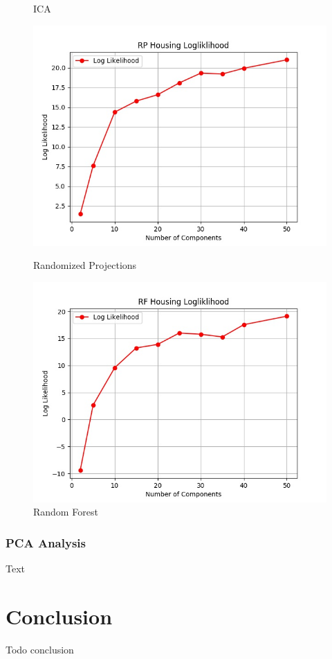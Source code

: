 \documentclass[h]{article}
\begin{document}
\begin{figure}[H]
      \caption*{ICA} 
   \endminipage\hfill
      \includegraphics[width=1\textwidth,keepaspectratio]{rp_housing_logliklihood.jpg} 
      \caption*{Randomized Projections} 
   \endminipage\hfill
      \includegraphics[width=1\textwidth,keepaspectratio]{rf_housing_logliklihood.jpg} 
      \caption*{Random Forest} 
   \endminipage\hfill
\end{figure}

\subsubsection*{PCA Analysis}
Text

\section*{Conclusion}  
Todo conclusion
\end{document}
